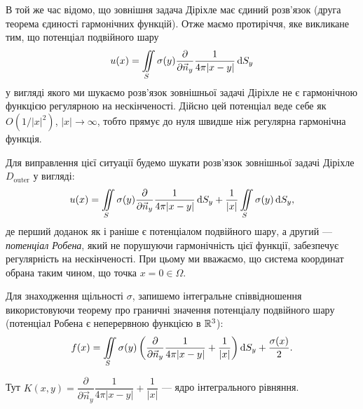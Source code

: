 В той же час відомо, що зовнішня задача Діріхле має єдиний розв'язок (друга теорема єдиності гармонічних функцій). Отже маємо протиріччя, яке викликане тим, що потенціал подвійного шару
\begin{equation}
	u(x) = \displaystyle\iint\limits_S \sigma(y) \frac{\partial}{\partial \vec n_y} \frac{1}{4 \pi |x - y|} \mathop{}\!\mathrm{d} S_y
\end{equation}
у вигляді якого ми шукаємо розв'язок зовнішньої задачі Діріхле не є гармонічною функцією регулярною на нескінченості. Дійсно цей потенціал веде себе як $O(1/|x|^2)$, $|x| \to \infty$, тобто прямує до нуля швидше ніж регулярна гармонічна функція. \medskip

Для виправлення цієї ситуації будемо шукати розв'язок зовнішньої задачі Діріхле $D_{\text{outer}}$ у вигляді:
\begin{equation}
	\label{eq:4.9.15}
	u(x) = \displaystyle\iint\limits_S \sigma(y) \frac{\partial}{\partial \vec n_y} \frac{1}{4 \pi |x - y|} \mathop{}\!\mathrm{d} S_y + \frac{1}{|x|} \displaystyle\iint\limits_S \sigma(y) \mathop{}\!\mathrm{d} S_y,
\end{equation}
де перший доданок як і раніше є потенціалом подвійного шару, а другий --- \textit{потенціал Робена}, який не порушуючи гармонічність цієї функції, забезпечує регулярність на нескінченості. При цьому ми вважаємо, що система координат обрана таким чином, що точка $x = 0 \in \Omega$. \medskip

Для знаходження щільності $\sigma$, запишемо інтегральне співвідношення використовуючи теорему про граничні значення потенціалу подвійного шару (потенціал Робена є неперервною функцією в $\mathbb{R}^3$):
\begin{equation}
	\label{eq:4.9.16}
	f(x) = \displaystyle\iint\limits_S \sigma(y) \left( \frac{\partial}{\partial \vec n_y} \frac{1}{4 \pi |x - y|} + \frac{1}{|x|} \right) \mathop{}\!\mathrm{d} S_y + \frac{\sigma(x)}{2}.
\end{equation}

Тут $K(x, y) = \dfrac{\partial}{\partial \vec n_y} \dfrac{1}{4 \pi |x - y|} + \dfrac{1}{|x|}$ --- ядро інтегрального рівняння. \medskip

